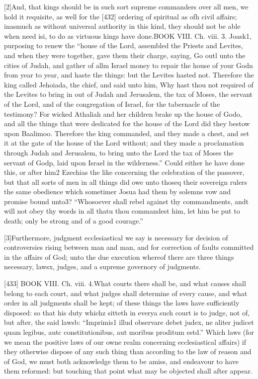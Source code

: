 [2]And, that kings should be in such sort supreme commanders over all men, we hold it requisite, as well for the [432] ordering of spiritual as ofh civil affairs; inasmuch as without universal authority in this kind, they should not be able when need isi, to do as virtuous kings have done.BOOK VIII. Ch. viii. 3. Joask1, purposing to renew the “house of the Lord, assembled the Priests and Levites, and when they were together, gave them their charge, saying, Go outl unto the cities of Judah, and gather of allm Israel money to repair the house of your Godn from year to year, and haste the things: but the Levites hasted not. Therefore the king called Jehoiada, the chief, and said unto him, Why hast thou not required of the Levites to bring in out of Judah and Jerusalem, the tax of Moses, the servant of the Lord, and of the congregation of Israel, for the tabernacle of the testimony? For wicked Athaliah and her children brake up the house of Godo, and all the things that were dedicated for the house of the Lord did they bestow upon Baalimoo. Therefore the king commanded, and they made a chest, and set it at the gate of the house of the Lord without; and they made a proclamation through Judah and Jerusalem, to bring unto the Lord the tax of Moses the servant of Godp, laid upon Israel in the wilderness.” Could either he have done this, or after him2 Ezechias the like concerning the celebration of the passover, but that all sorts of men in all things did owe unto thoseq their sovereign rulers the same obedience which sometimer Josua had them by solemns vow and promise bound unto3? “Whosoever shall rebel against thy commandments, andt will not obey thy words in all thatu thou commandest him, let him be put to death; only be strong and of a good courage.”

[3]Furthermore, judgment ecclesiastical we say is necessary for decision of controversies rising between man and man, and for correction of faults committed in the affairs of God; unto the due execution whereof there are three things necessary, lawsx, judges, and a supreme governory of judgments.

[433]
BOOK VIII. Ch. viii. 4.What courts there shall be, and what causes shall belong to each court, and what judges shall determine of every cause, and what order in all judgments shall be kept; of these things the laws have sufficiently disposed: so that his duty whichz sitteth in everya such court is to judge, not of, but after, the said lawsb: “Imprimis1 illud observare debet judex, ne aliter judicet quam legibus, autc constitutionibus, aut moribus proditum estd.” Which laws (for we mean the positive laws of our owne realm concerning ecclesiastical affairs) if they otherwise dispose of any such thing than according to the law of reason and of God, we must both acknowledge them to be amiss, and endeavour to have them reformed: but touching that point what may be objected shall after appear.

